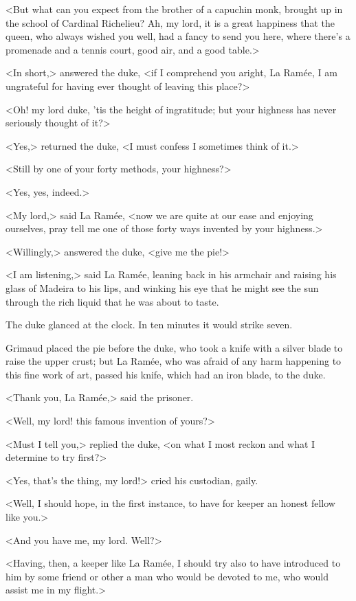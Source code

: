 <But what can you expect from the brother of a capuchin monk, brought up in the school of Cardinal Richelieu? Ah, my lord, it is a great happiness that the queen, who always wished you well, had a fancy to send you here, where there's a promenade and a tennis court, good air, and a good table.>

<In short,> answered the duke, <if I comprehend you aright, La Ramée, I am ungrateful for having ever thought of leaving this place?>

<Oh! my lord duke, 'tis the height of ingratitude; but your highness has never seriously thought of it?>

<Yes,> returned the duke, <I must confess I sometimes think of it.>

<Still by one of your forty methods, your highness?>

<Yes, yes, indeed.>

<My lord,> said La Ramée, <now we are quite at our ease and enjoying ourselves, pray tell me one of those forty ways invented by your highness.>

<Willingly,> answered the duke, <give me the pie!>

<I am listening,> said La Ramée, leaning back in his armchair and raising his glass of Madeira to his lips, and winking his eye that he might see the sun through the rich liquid that he was about to taste.

The duke glanced at the clock. In ten minutes it would strike seven.

Grimaud placed the pie before the duke, who took a knife with a silver blade to raise the upper crust; but La Ramée, who was afraid of any harm happening to this fine work of art, passed his knife, which had an iron blade, to the duke.

<Thank you, La Ramée,> said the prisoner.

<Well, my lord! this famous invention of yours?>

<Must I tell you,> replied the duke, <on what I most reckon and what I determine to try first?>

<Yes, that's the thing, my lord!> cried his custodian, gaily.

<Well, I should hope, in the first instance, to have for keeper an honest fellow like you.>

<And you have me, my lord. Well?>

<Having, then, a keeper like La Ramée, I should try also to have introduced to him by some friend or other a man who would be devoted to me, who would assist me in my flight.>

